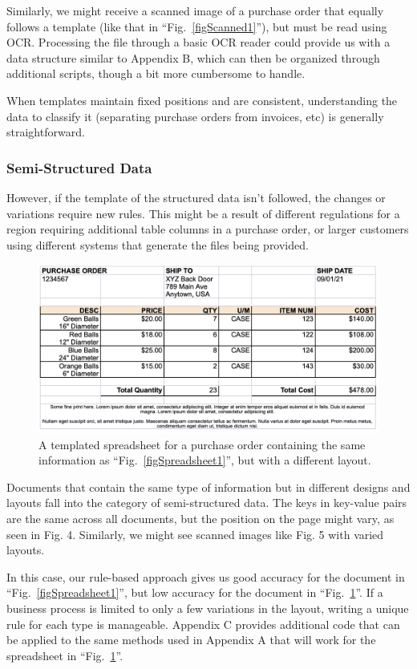 \documentclass[conference]{IEEEtran}
\begin{document}
Similarly, we might receive a scanned image of a purchase order that equally follows a template (like that in ``Fig.~\ref{figScanned1}''), but must be read using OCR. Processing the file through a basic OCR reader could provide us with a data structure similar to Appendix B, which can then be organized through additional scripts, though a bit more cumbersome to handle.

When templates maintain fixed positions and are consistent, understanding the data to classify it (separating purchase orders from invoices, etc) is generally straightforward.

\subsubsection{Semi-Structured Data}
However, if the template of the structured data isn't followed, the changes or variations require new rules. This might be a result of different regulations for a region requiring additional table columns in a purchase order, or larger customers using different systems that generate the files being provided.

\begin{figure}[ht]
\centerline{\includegraphics[width=\columnwidth]{Spreadsheet2.png}}
\caption{A templated spreadsheet for a purchase order containing the same information as ``Fig.~\ref{figSpreadsheet1}'', but with a different layout.}
\label{figSpreadsheet2}
\end{figure}

Documents that contain the same type of information but in different designs and layouts fall into the category of semi-structured data. The keys in key-value pairs are the same across all documents, but the position on the page might vary, as seen in Fig. 4. Similarly, we might see scanned images like Fig. 5 with varied layouts.

In this case, our rule-based approach gives us good accuracy for the document in ``Fig.~\ref{figSpreadsheet1}'', but low accuracy for the document in ``Fig.~\ref{figSpreadsheet2}''. If a business process is limited to only a few variations in the layout, writing a unique rule for each type is manageable. Appendix C provides additional code that can be applied to the same methods used in Appendix A that will work for the spreadsheet in ``Fig.~\ref{figSpreadsheet2}''.
\end{document}
